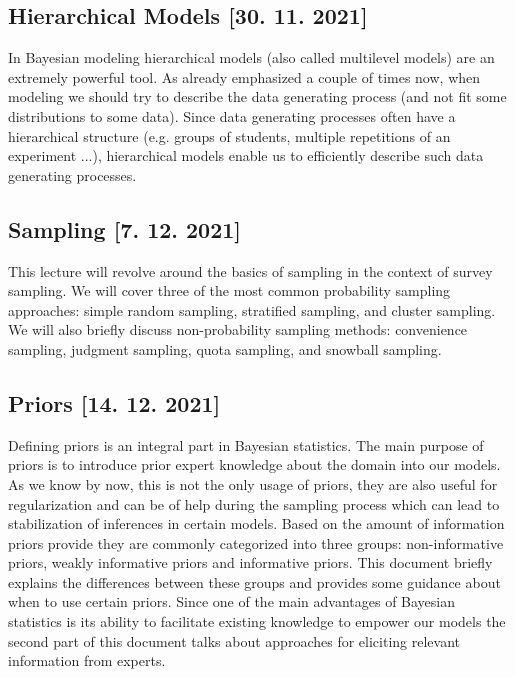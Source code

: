 \documentclass[fleqn,moreauthors,10pt]{ds_report}
\begin{document}
\subsection*{Hierarchical Models [30. 11. 2021]}

In Bayesian modeling hierarchical models (also called multilevel models) are an extremely powerful tool. As already emphasized a couple of times now, when modeling we should try to describe the data generating process (and not fit some distributions to some data). Since data generating processes often have a hierarchical structure (e.g. groups of students, multiple repetitions of an experiment ...), hierarchical models enable us to efficiently describe such data generating processes.

\subsection*{Sampling [7. 12. 2021]}

This lecture will revolve around the basics of sampling in the context of survey sampling. We will cover three of the most common probability sampling approaches: simple random sampling, stratified sampling, and cluster sampling. We will also briefly discuss non-probability sampling methods: convenience sampling, judgment sampling, quota sampling, and snowball sampling.

\subsection*{Priors [14. 12. 2021]}

Defining priors is an integral part in Bayesian statistics. The main purpose of priors is to introduce prior expert knowledge about the domain into our models. As we know by now, this is not the only usage of priors, they are also useful for regularization and can be of help during the sampling process which can lead to stabilization of inferences in certain models. Based on the amount of information priors provide they are commonly categorized into three groups: non-informative priors, weakly informative priors and informative priors. This document briefly explains the differences between these groups and provides some guidance about when to use certain priors. Since one of the main advantages of Bayesian statistics is its ability to facilitate existing knowledge to empower our models the second part of this document talks about approaches for eliciting relevant information from experts.
\end{document}
